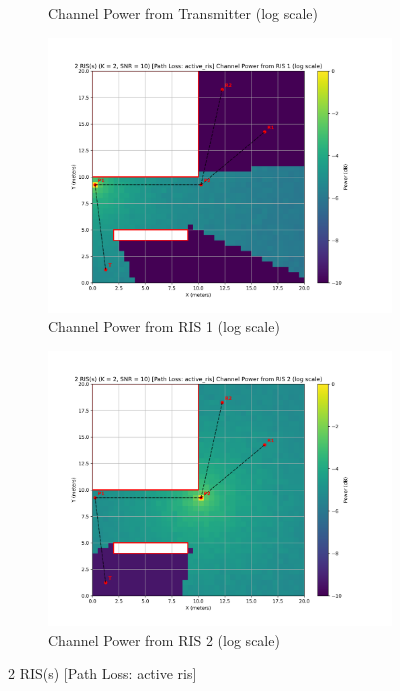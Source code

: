 \begin{figure}[H]
\begin{subfigure}[b]{0.48\textwidth}
    \caption{Channel Power from Transmitter (log scale)}
  \end{subfigure}
  \medskip
  \centering
  \begin{subfigure}[b]{0.48\textwidth}
    \centering
    \includegraphics[width=\textwidth]{imgs/heatmap-simulations/2 RIS(s) (K = 2, SNR = 10) [Path Loss_ active_ris] Channel Power from RIS 1 (log scale).png}
    \caption{Channel Power from RIS 1 (log scale)}
  \end{subfigure}
  \hfill
  \begin{subfigure}[b]{0.48\textwidth}
    \centering
    \includegraphics[width=\textwidth]{imgs/heatmap-simulations/2 RIS(s) (K = 2, SNR = 10) [Path Loss_ active_ris] Channel Power from RIS 2 (log scale).png}
    \caption{Channel Power from RIS 2 (log scale)}
  \end{subfigure}
  \caption{2 RIS(s) [Path Loss: active ris]}
\end{figure}

